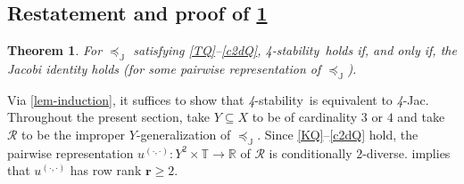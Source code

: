 \documentclass[ecta,nameyear,draft]{econsocart}
\newcommand{\R}{\mathbb R}
\newcommand{\mc}{\mathcal}
\newcommand{\ext}{\mathrel{\mc R}}
\newcommand{\mbbt}{{\mathds {T}}}
\newcommand{\mbbj}{\mathds J}
\newcommand{\dd}{{(\cdot,\cdot)}}
\newcommand{\stability}{\textit{4}-\textup{{stability}}}
\newcommand{\fourjac}{\textup{\textit{4}-Jac}}
\theoremstyle{plain}
\newtheorem{theorem}{Theorem}%
\theoremstyle{remark}
\begin{document}
\begin{appendix}
  \section{Restatement and proof of \cref{thm-foureq}}\label{sec-proof-foureq}
  \setcounter{theorem}{2}
  \begin{theorem}\label{thm-foureq} For $\preceq_{\mbbj}$ satisfying
    \ref{TQ}--\ref{c2dQ}, \stability\ holds if, and only if, the Jacobi
    identity holds (for some pairwise representation of $\preceq_{\mbbj}$).
  \end{theorem}
  Via \cref{lem-induction}, it suffices to show that \stability\ is equivalent
  to \fourjac. Throughout the present section, take $Y\subseteq X$ to be of
  cardinality $3$ or $4$ and take $\ext$ to be the improper
  $Y$-generalization of $\preceq_{\mbbj}$. Since
  \ref{KQ}--\ref{c2dQ} hold, the pairwise representation $u^{\dd}: Y^{2}\times
  \mbbt \rightarrow \R$ of $\ext$ is conditionally $2$-diverse. 
   implies that $u^{\dd}$ has row rank $\mathbf r \geq 2$.


\end{appendix}
\end{document}
